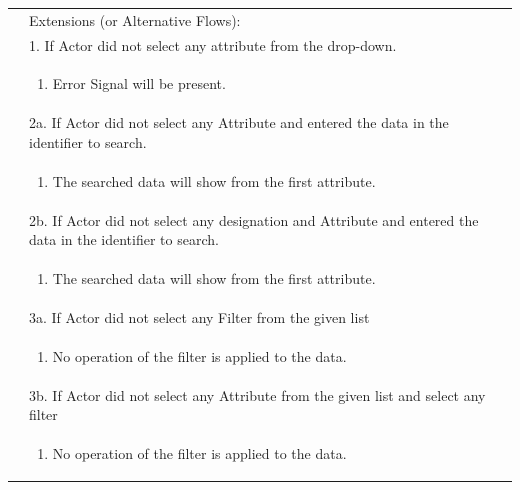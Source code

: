 \documentclass[12pt,a4paper]{article}
\begin{document}
\begin{longtable}{| p{3cm}|p{12cm}|}
&Extensions (or Alternative Flows):\\

& 1. If Actor did not select any attribute from the drop-down. \\
& \begin{enumerate}
		\item Error Signal will be present.
	\end{enumerate}
\\ 

& 2a. If Actor did not select any Attribute and entered the data in the identifier to search. \\
& \begin{enumerate}
		\item The searched data will show from the first attribute.
	\end{enumerate}
\\ 
& 2b. If Actor did not select any designation and  Attribute and entered the data in the identifier to search. \\
& \begin{enumerate}
		\item The searched data will show from the first attribute.
	\end{enumerate}
\\ 

& 3a. If Actor did not select any Filter from the given list \\
& \begin{enumerate}
		\item No operation of the filter is applied to the data.
	\end{enumerate}
\\ 
& 3b. If Actor did not select any Attribute from the given list and select any filter  \\
& \begin{enumerate}
		\item No operation of the filter is applied to the data.
	\end{enumerate}
\\ 


\end{longtable}
\end{document}
